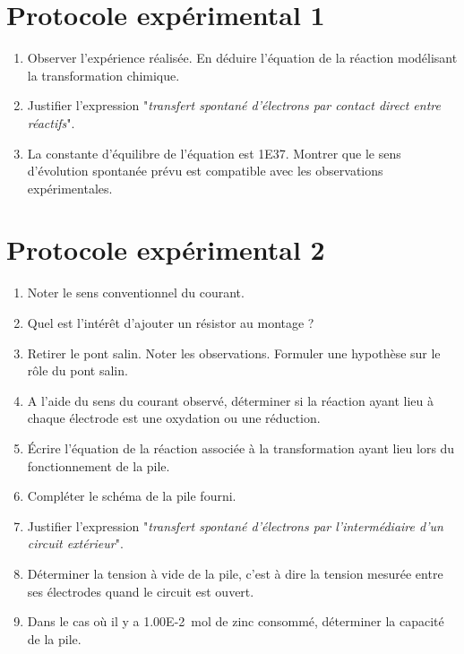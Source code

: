 \documentclass[a4paper,11pt,fleqn]{scrartcl}%
\begin{document}
\section*{Protocole expérimental 1}
\begin{enumerate}
	\item Observer l'expérience réalisée. En déduire l'équation de la réaction modélisant la transformation chimique.
	\item Justifier l'expression "\emph{transfert spontané d'électrons par contact direct entre réactifs}".

	\item La constante d'équilibre de l'équation est \num{1E37}. Montrer que le sens d'évolution spontanée prévu est compatible avec les observations expérimentales.
\end{enumerate}
\newpage
\section*{Protocole expérimental 2}
\begin{enumerate}[resume]
	\item Noter le sens conventionnel du courant.
	\item Quel est l'intérêt d'ajouter un résistor au montage ?
	\item Retirer le pont salin. Noter les observations. Formuler une hypothèse sur le rôle du pont salin.
	\item A l'aide du sens du courant observé, déterminer si la réaction ayant lieu à chaque électrode est une oxydation ou une réduction.
	\item Écrire l'équation de la réaction associée à la transformation ayant lieu lors du fonctionnement de la pile.
	\item Compléter le schéma de la pile fourni.
	\item Justifier l'expression "\emph{transfert spontané d'électrons par l'intermédiaire d'un circuit extérieur}".
	\item Déterminer la tension à vide de la pile, c'est à dire la tension mesurée entre ses électrodes quand le circuit est ouvert.
	\item Dans le cas où il y a \SI{1.00E-2}{\mole} de zinc consommé, déterminer la capacité de la pile.
\end{enumerate}
\end{document}

